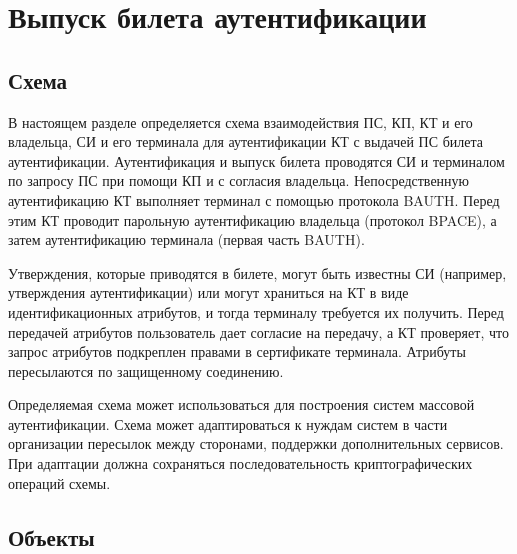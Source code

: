 \chapter{Выпуск билета аутентификации}\label{FLOW}

\section{Схема}\label{FLOW.Common}

В настоящем разделе определяется схема взаимодействия ПС, КП, КТ и его
владельца, СИ и его терминала для аутентификации КТ с выдачей ПС билета
аутентификации.
%
Аутентификация и выпуск билета проводятся СИ и терминалом по запросу ПС при 
помощи КП и с согласия владельца.
%
Непосредственную аутентификацию КТ выполняет терминал с помощью протокола BAUTH.
Перед этим КТ проводит парольную аутентификацию владельца (протокол BPACE), а
затем аутентификацию терминала (первая часть BAUTH).

Утверждения, которые приводятся в билете, могут быть известны СИ
(например, утверждения аутентификации) или могут храниться на КТ в виде 
идентификационных атрибутов, и тогда терминалу требуется их получить.
%
Перед передачей атрибутов пользователь дает согласие на передачу, а КТ 
проверяет, что запрос атрибутов подкреплен правами в сертификате 
терминала. Атрибуты пересылаются по защищенному соединению.

Определяемая схема может использоваться для построения систем массовой 
аутентификации. Схема может адаптироваться к нуждам систем в части 
организации пересылок между сторонами, поддержки дополнительных сервисов. 
При адаптации должна сохраняться последовательность криптографических 
операций схемы.

\section{Объекты}

